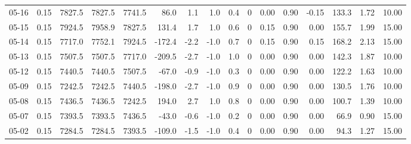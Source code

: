 \begin{threeparttable}
{\begin{tabular}{lrrrrrrrrrrrrrrr}
  05-16 &     0.15 & 7827.5 & 7827.5 & 7741.5 &       86.0 &            1.1 &                      1.0 &                 0.4 &              0 &       0.00 &      0.90 &          -0.15 &            133.3 &            1.72 &                  10.00 \\
  05-15 &     0.15 & 7924.5 & 7958.9 & 7827.5 &      131.4 &            1.7 &                      1.0 &                 0.6 &              0 &       0.15 &      0.90 &           0.00 &            155.7 &            1.99 &                  15.00 \\
  05-14 &     0.15 & 7717.0 & 7752.1 & 7924.5 &     -172.4 &           -2.2 &                     -1.0 &                 0.7 &              0 &       0.15 &      0.90 &           0.15 &            168.2 &            2.13 &                  15.00 \\
  05-13 &     0.15 & 7507.5 & 7507.5 & 7717.0 &     -209.5 &           -2.7 &                     -1.0 &                 1.0 &              0 &       0.00 &      0.90 &           0.00 &            142.3 &            1.87 &                  10.00 \\
  05-12 &     0.15 & 7440.5 & 7440.5 & 7507.5 &      -67.0 &           -0.9 &                     -1.0 &                 0.3 &              0 &       0.00 &      0.90 &           0.00 &            122.2 &            1.63 &                  10.00 \\
  05-09 &     0.15 & 7242.5 & 7242.5 & 7440.5 &     -198.0 &           -2.7 &                     -1.0 &                 0.9 &              0 &       0.00 &      0.90 &           0.00 &            130.5 &            1.76 &                  10.00 \\
  05-08 &     0.15 & 7436.5 & 7436.5 & 7242.5 &      194.0 &            2.7 &                      1.0 &                 0.8 &              0 &       0.00 &      0.90 &           0.00 &            100.7 &            1.39 &                  10.00 \\
  05-07 &     0.15 & 7393.5 & 7393.5 & 7436.5 &      -43.0 &           -0.6 &                     -1.0 &                 0.2 &              0 &       0.00 &      0.90 &           0.00 &             66.9 &            0.90 &                  15.00 \\
  05-02 &     0.15 & 7284.5 & 7284.5 & 7393.5 &     -109.0 &           -1.5 &                     -1.0 &                 0.4 &              0 &       0.00 &      0.90 &           0.00 &             94.3 &            1.27 &                  15.00 \\

\end{tabular}}
\end{threeparttable}
